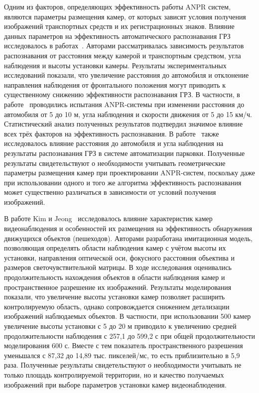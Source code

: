 \documentclass[12pt]{article}
\theoremstyle{definition}
\begin{document}
Одним из факторов, определяющих эффективность работы ANPR систем, являются параметры размещения камер, от которых зависят условия получения изображений транспортных средств и их регистрационных знаков. Влияние данных параметров на эффективность автоматического распознавания ГРЗ исследовалось в работах~\cite{Netinant2024,Pradhan2025,Glasenapp2023}. Авторами рассматривалась зависимость результатов распознавания от расстояния между камерой и транспортным средством, угла наблюдения и высоты установки камеры. Результаты экспериментальных исследований показали, что увеличение расстояния до автомобиля и отклонение направления наблюдения от фронтального положения могут приводить к существенному снижению эффективности распознавания ГРЗ. В частности, в работе~\cite{Netinant2024} проводились испытания ANPR-системы при изменении расстояния до автомобиля от 5 до 10 м, угла наблюдения и скорости движения от 5 до 15 км/ч. Статистический анализ полученных результатов подтвердил значимое влияние всех трёх факторов на эффективность распознавания. В работе~\cite{Pradhan2025} также исследовалось влияние расстояния до автомобиля и угла наблюдения на результаты распознавания ГРЗ в системе автоматизации парковки. Полученные результаты свидетельствуют о необходимости учитывать геометрические параметры размещения камер при проектировании ANPR-систем, поскольку даже при использовании одного и того же алгоритма эффективность распознавания может существенно различаться в зависимости от условий получения изображений.

В работе Kim и Jeong~\cite{Kim2023} исследовалось влияние характеристик камер видеонаблюдения и особенностей их размещения на эффективность обнаружения движущихся объектов (пешеходов). Авторами разработана имитационная модель, позволяющая определять области наблюдения камер с учётом высоты их установки, направления оптической оси, фокусного расстояния объектива и размеров светочувствительной матрицы. В ходе исследования оценивались продолжительность нахождения объектов в области наблюдения камер и пространственное разрешение их изображений. Результаты моделирования показали, что увеличение высоты установки камер позволяет расширить контролируемую область, однако сопровождается снижением детализации изображений наблюдаемых объектов. В частности, при использовании 500 камер увеличение высоты установки с 5 до 20 м приводило к увеличению средней продолжительности наблюдения с 257,1 до 599,2 с при общей продолжительности моделирования 600 с. Вместе с тем показатель пространственного разрешения уменьшался с 87,32 до 14,89 тыс. пикселей/мс, то есть приблизительно в 5,9 раза. Полученные результаты свидетельствуют о необходимости учитывать не только площадь контролируемой территории, но и качество получаемых изображений при выборе параметров установки камер видеонаблюдения.
\end{document}
